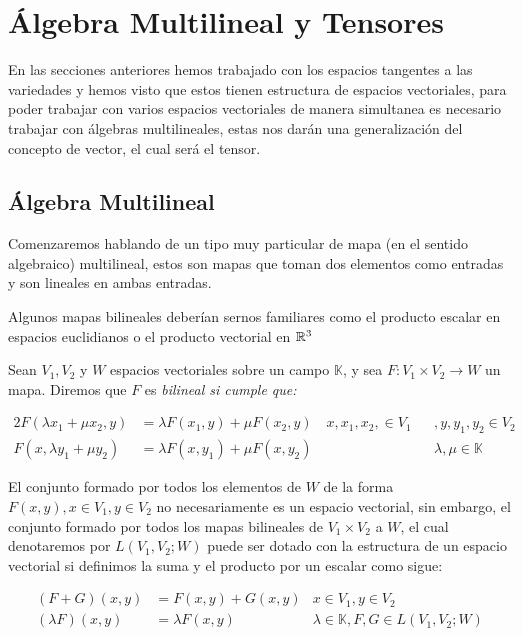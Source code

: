 \chapter{Álgebra Multilineal y Tensores}\label{Sección: Álgebra Multilineal y Tensores}

En las secciones anteriores hemos trabajado con los espacios tangentes a las variedades y hemos visto que estos tienen estructura de espacios vectoriales, para poder trabajar con varios espacios vectoriales de manera simultanea es necesario trabajar con álgebras multilineales, estas nos darán una generalización del concepto de vector, el cual será el tensor.

\section{Álgebra Multilineal}

Comenzaremos hablando de un tipo muy particular de mapa (en el sentido algebraico) multilineal, estos son mapas que toman dos elementos como entradas y son lineales en ambas entradas.

Algunos mapas bilineales deberían sernos familiares como el producto escalar en espacios euclidianos o  el producto vectorial en $\mathbb{R}^3$

\begin{definition}
  Sean $V_1,V_2$ y $W$ espacios vectoriales sobre un campo $\mathbb{K}$, y sea $F: V_1 \times V_2 \to W$ un mapa. Diremos que $F$ es \it{bilineal} si cumple que:

\begin{alignat*}{2}
  F(\lambda x_1 + \mu x_2, y) &= \lambda F(x_1,y) + \mu F(x_2,y)  \quad x,x_1,x_2, \in V_1 &&, y,y_1,y_2 \in V_2\\
  F(x, \lambda y_1 + \mu y_2) &= \lambda F(x,y_1) + \mu F(x,y_2) \quad &&\lambda ,\mu \in \mathbb{K}
\end{alignat*}
\end{definition}

El conjunto formado por todos los elementos de $W$ de la forma $F(x,y), x\in V_1, y\in V_2$ no necesariamente es un espacio vectorial, sin embargo, el conjunto formado por todos los mapas bilineales de $V_1\times V_2$ a $W$, el cual denotaremos por $L(V_1,V_2;W)$ puede ser dotado con la estructura de un espacio vectorial si definimos la suma y el producto por un escalar como sigue:

\begin{align*}
  (F + G)(x,y) &= F(x,y) + G(x,y) & x\in V_1, y\in V_2\\
  (\lambda F)(x,y) &= \lambda F(x,y) & \lambda \in \mathbb{K}, F,G \in L(V_1,V_2;W)
\end{align*}

